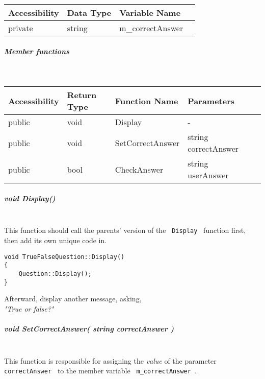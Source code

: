 \documentclass[a4paper,12pt]{book}
\begin{document}
                            \begin{tabular}{ l l l l }
                                Accessibility & Data Type & Variable Name \\ \hline{}
                                private & string & m\_correctAnswer 
                            \end{tabular}
                        
                        \subparagraph{ Member functions } ~\\

                            \begin{tabular}{ l l l l l }
                                Accessibility & Return Type & Function Name & Parameters  \\ \hline{}
                                public & void & Display & -  \\ \hline{}
                                public & void & SetCorrectAnswer & string correctAnswer \\ \hline{}
                                public & bool & CheckAnswer & string userAnswer
                            \end{tabular}

                        \subparagraph{ void Display() } ~\\

                            This function should call the parents' version of
                            the \texttt{ Display } function first, then add
                            its own unique code in.
                            
\begin{lstlisting}[style=code]
void TrueFalseQuestion::Display()
{
    Question::Display();
}
\end{lstlisting}
                            Afterward, display another message, asking, \\
                            \textit{ "True or false?" }

                        \newpage
                        \subparagraph{ void SetCorrectAnswer( string correctAnswer ) }  ~\\

                            This function is responsible for assigning the \textit{ value }
                            of the parameter \texttt{ correctAnswer } to the member variable
                            \texttt{ m\_correctAnswer }.
\end{document}
